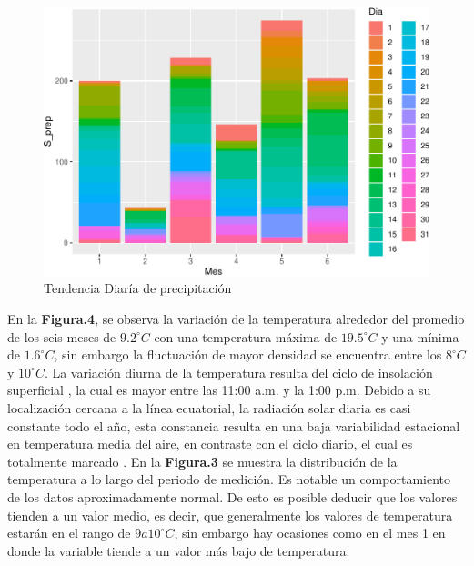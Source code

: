 \documentclass[conference,final,]{IEEEtran}
\makeatletter
\def\maxwidth{\ifdim\Gin@nat@width>\linewidth\linewidth
\else\Gin@nat@width\fi}
\let\Oldincludegraphics\includegraphics
\renewcommand{\includegraphics}[1]{\Oldincludegraphics[width=\maxwidth]{#1}}
\makeatother
\begin{document}
\begin{figure}
\centering
\includegraphics{Hidrology_files/figure-latex/unnamed-chunk-1-1.pdf}
\caption{Tendencia Diaría de precipitación}
\end{figure}

En la \textbf{Figura.4}, se observa la variación de la temperatura
alrededor del promedio de los seis meses de \(9.2^{\circ}C\) con una
temperatura máxima de \(19.5^{\circ}C\) y una mínima de
\(1.6^{\circ}C\), sin embargo la fluctuación de mayor densidad se
encuentra entre los \(8^{\circ}C\) y \(10^{\circ}C\). La variación
diurna de la temperatura resulta del ciclo de insolación superficial
\citep{poveda2004hidroclimatologia}, la cual es mayor entre las 11:00
a.m. y la 1:00 p.m. Debido a su localización cercana a la línea
ecuatorial, la radiación solar diaria es casi constante todo el año,
esta constancia resulta en una baja variabilidad estacional en
temperatura media del aire, en contraste con el ciclo diario, el cual es
totalmente marcado \citep{buytaert2006hidrologia}. En la \textbf{Figura.3}
se muestra la distribución de la temperatura a lo largo del periodo de
medición. Es notable un comportamiento de los datos aproximadamente
normal. De esto es posible deducir que los valores tienden a un valor
medio, es decir, que generalmente los valores de temperatura estarán en
el rango de \(9 a 10^{\circ}C\), sin embargo hay ocasiones como en el
mes 1 en donde la variable tiende a un valor más bajo de temperatura.
\end{document}
